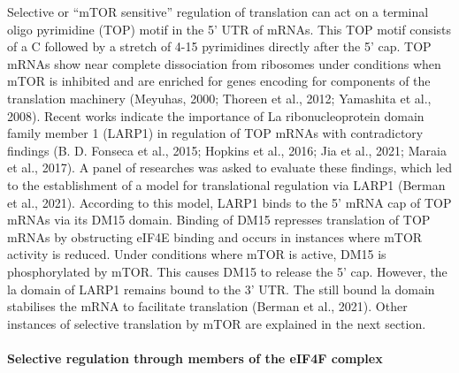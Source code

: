 \documentclass[12pt,openany]{book}
\begin{document}
Selective or ``mTOR sensitive'' regulation of translation can act on a
terminal oligo pyrimidine (TOP) motif in the 5' UTR of mRNAs. This TOP
motif consists of a C followed by a stretch of 4-15 pyrimidines directly
after the 5' cap. TOP mRNAs show near complete dissociation from
ribosomes under conditions when mTOR is inhibited and are enriched for
genes encoding for components of the translation machinery (Meyuhas,
2000; Thoreen et al., 2012; Yamashita et al., 2008). Recent works
indicate the importance of La ribonucleoprotein domain family member 1
(LARP1) in regulation of TOP mRNAs with contradictory findings (B. D.
Fonseca et al., 2015; Hopkins et al., 2016; Jia et al., 2021; Maraia et
al., 2017). A panel of researches was asked to evaluate these findings,
which led to the establishment of a model for translational regulation
via LARP1 (Berman et al., 2021). According to this model, LARP1 binds to
the 5' mRNA cap of TOP mRNAs via its DM15 domain. Binding of DM15
represses translation of TOP mRNAs by obstructing eIF4E binding and
occurs in instances where mTOR activity is reduced. Under conditions
where mTOR is active, DM15 is phosphorylated by mTOR. This causes DM15
to release the 5' cap. However, the la domain of LARP1 remains bound to
the 3' UTR. The still bound la domain stabilises the mRNA to facilitate
translation (Berman et al., 2021). Other instances of selective
translation by mTOR are explained in the next section.

\paragraph{Selective regulation through members of the eIF4F complex} \label{sel4F}
\end{document}
